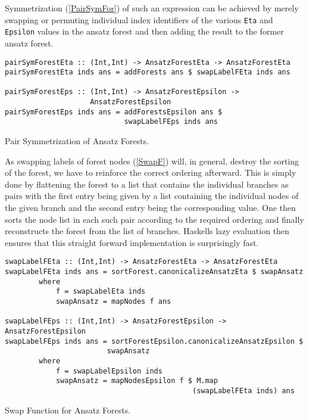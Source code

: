 Symmetrization (\ref{PairSymFor}) of such an expression can be achieved by merely swapping or permuting individual index identifiers of the various \texttt{Eta} and \texttt{Epsilon} values in the ansatz forest and then adding the result to the former ansatz forest.
\begin{listing}[hbt!] 
\begin{verbatim}
pairSymForestEta :: (Int,Int) -> AnsatzForestEta -> AnsatzForestEta
pairSymForestEta inds ans = addForests ans $ swapLabelFEta inds ans

pairSymForestEps :: (Int,Int) -> AnsatzForestEpsilon ->
                    AnsatzForestEpsilon
pairSymForestEps inds ans = addForestsEpsilon ans $ 
                            swapLabelFEps inds ans
\end{verbatim} 
\caption{Pair Symmetrization of Ansatz Forests.}\label{PairSymFor}
\end{listing}
As swapping labels of forest nodes (\ref{SwapF}) will, in general, destroy the sorting of the forest, we have to reinforce the correct ordering afterward. This is simply done by flattening the forest to a list that contains the individual branches as pairs with the first entry being given by a list containing the individual nodes of the given branch and the second entry being the corresponding value. One then sorts the node list in each such pair according to the required ordering and finally reconstructs the forest from the list of branches.
Haskells lazy evaluation then ensures that this straight forward implementation is surprisingly fast.
\begin{listing}[hbt!] 
\begin{verbatim}
swapLabelFEta :: (Int,Int) -> AnsatzForestEta -> AnsatzForestEta
swapLabelFEta inds ans = sortForest.canonicalizeAnsatzEta $ swapAnsatz
        where
            f = swapLabelEta inds
            swapAnsatz = mapNodes f ans

swapLabelFEps :: (Int,Int) -> AnsatzForestEpsilon -> AnsatzForestEpsilon
swapLabelFEps inds ans = sortForestEpsilon.canonicalizeAnsatzEpsilon $ 
                        swapAnsatz
        where
            f = swapLabelEpsilon inds
            swapAnsatz = mapNodesEpsilon f $ M.map 
                                            (swapLabelFEta inds) ans
\end{verbatim}
\caption{Swap Function for Ansatz Forests.}\label{SwapF}
\end{listing}

